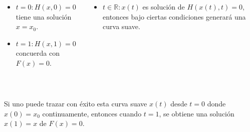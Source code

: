 \begin{frame}
	\begin{columns}
		\begin{column}{0.48\textwidth}
			\begin{itemize}
				\item

				      $t=0: H\left(x,0\right)=0$ tiene una solución $x=x_{0}$.

				\item

				      $t=1: H\left(x,1\right)=0$ concuerda con
				      $F\left(x\right)=0$.
			\end{itemize}
		\end{column}
		\begin{column}{0.48\textwidth}
			\begin{itemize}
				\item

				      $t\in\mathbb{R}: x\left(t\right)$ es solución de
				      $H\left(x\left(t\right),t\right)=0$, entonces bajo
				      ciertas condiciones generará una curva suave.
			\end{itemize}
		\end{column}
	\end{columns}

	\

	Si uno puede trazar con éxito esta curva suave $x\left(t\right)$
	desde $t=0$ donde $x\left(0\right)=x_{0}$ continuamente, entonces
	cuando $t=1$, se obtiene una solución $x\left(1\right)=x$
	de $F\left(x\right)=0$.
\end{frame}

